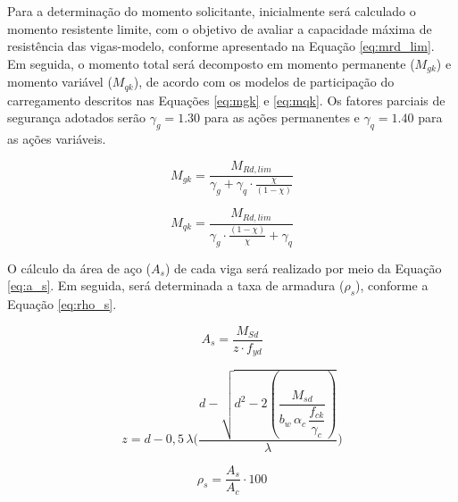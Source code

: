 Para a determinação do momento solicitante, inicialmente será calculado o momento resistente limite, com o objetivo de avaliar a capacidade máxima de resistência das vigas-modelo, conforme apresentado na Equação \eqref{eq:mrd_lim}. Em seguida, o momento total será decomposto em momento permanente ($M_{gk}$) e momento variável ($M_{qk}$), de acordo com os modelos de participação do carregamento descritos nas Equações \eqref{eq:mgk} e \eqref{eq:mqk}. Os fatores parciais de segurança adotados serão $\gamma_g = 1.30$ para as ações permanentes e $\gamma_q = 1.40$ para as ações variáveis. 

\begin{equation}
M_{gk} = \frac{M_{Rd,lim}}{\gamma_g + \gamma_q \cdot \frac{\chi}{(1 - \chi)}}
\label{eq:mgk}
\end{equation}

\vspace{6pt}

\begin{equation}
M_{qk} = \frac{M_{Rd,lim}}{\gamma_g \cdot \frac{(1 - \chi)}{\chi} + \gamma_q}
\label{eq:mqk}
\end{equation}

O cálculo da área de aço ($A_s$) de cada viga será realizado por meio da Equação \eqref{eq:a_s}. Em seguida, será determinada a taxa de armadura ($\rho_s$), conforme a Equação \eqref{eq:rho_s}.

\begin{equation}\label{eq:a_s}
A_s = \frac{M_{Sd}}{z \cdot f_{yd}}
\end{equation}

\begin{equation}
z = d - 0{,}5\,\lambda 
\bigg(
    \frac{d - \sqrt{d^{2} - 2
    \left(
        \dfrac{M_{sd}}{b_w\,\alpha_c\,\dfrac{f_{ck}}{\gamma_c}}
    \right)
    }}{\lambda}
\bigg)
\label{eq:braco_z}
\end{equation}

\begin{equation}\label{eq:rho_s}
\rho_s = \frac{A_s}{A_c} \cdot 100
\end{equation}

